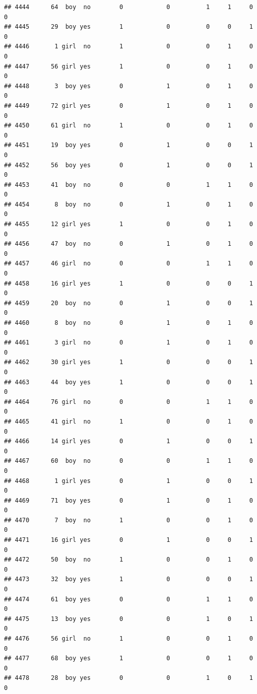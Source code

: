 \documentclass[man]{apa6}
\begin{document}
\begin{verbatim}
## 4444      64  boy  no        0            0          1     1     0     0
## 4445      29  boy yes        1            0          0     0     1     0
## 4446       1 girl  no        1            0          0     1     0     0
## 4447      56 girl yes        1            0          0     1     0     0
## 4448       3  boy yes        0            1          0     1     0     0
## 4449      72 girl yes        0            1          0     1     0     0
## 4450      61 girl  no        1            0          0     1     0     0
## 4451      19  boy yes        0            1          0     0     1     0
## 4452      56  boy yes        0            1          0     0     1     0
## 4453      41  boy  no        0            0          1     1     0     0
## 4454       8  boy  no        0            1          0     1     0     0
## 4455      12 girl yes        1            0          0     1     0     0
## 4456      47  boy  no        0            1          0     1     0     0
## 4457      46 girl  no        0            0          1     1     0     0
## 4458      16 girl yes        1            0          0     0     1     0
## 4459      20  boy  no        0            1          0     0     1     0
## 4460       8  boy  no        0            1          0     1     0     0
## 4461       3 girl  no        0            1          0     1     0     0
## 4462      30 girl yes        1            0          0     0     1     0
## 4463      44  boy yes        1            0          0     0     1     0
## 4464      76 girl  no        0            0          1     1     0     0
## 4465      41 girl  no        1            0          0     1     0     0
## 4466      14 girl yes        0            1          0     0     1     0
## 4467      60  boy  no        0            0          1     1     0     0
## 4468       1 girl yes        0            1          0     0     1     0
## 4469      71  boy yes        0            1          0     1     0     0
## 4470       7  boy  no        1            0          0     1     0     0
## 4471      16 girl yes        0            1          0     0     1     0
## 4472      50  boy  no        1            0          0     1     0     0
## 4473      32  boy yes        1            0          0     0     1     0
## 4474      61  boy yes        0            0          1     1     0     0
## 4475      13  boy yes        0            0          1     0     1     0
## 4476      56 girl  no        1            0          0     1     0     0
## 4477      68  boy yes        1            0          0     1     0     0
## 4478      28  boy yes        0            0          1     0     1     0

\end{verbatim}
\end{document}

